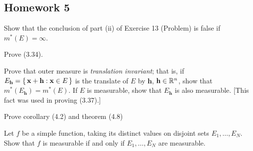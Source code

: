 \subsection{Homework 5}
\begin{problem}
  Show that the conclusion of part (ii) of Exercise 13 (Problem) is false
  if $m^*(E)=\infty$.
\end{problem}
\begin{solution}
\end{solution}

\begin{problem}
  Prove (3.34).
\end{problem}
\begin{solution}
\end{solution}

\begin{problem}
  Prove that outer measure is \emph{translation invariant}; that is, if
  $E_{\textbf{h}}=\left\{\,\mathbf{x}+\mathbf{h}:\mathbf{x}\in E\,\right\}$ is
  the translate of $E$ by $\mathbf{h}$, $\mathbf{h}\in\mathbb{R}^n$, show that
  $m^*(E_{\mathbf{h}})=m^*(E)$. If $E$ is measurable, show that
  $E_{\mathbf{h}}$ is also measurable. [This fact was used in proving
  (3.37).]
\end{problem}
\begin{solution}
\end{solution}

\begin{problem}
  Prove corollary (4.2) and theorem (4.8)
\end{problem}
\begin{solution}
\end{solution}

\begin{problem}
  Let $f$ be a simple function, taking its distinct values on disjoint sets
  $E_1,\ldots,E_N$. Show that $f$ is measurable if and only if
  $E_1,\ldots,E_N$ are measurable.
\end{problem}
\begin{solution}
\end{solution}

